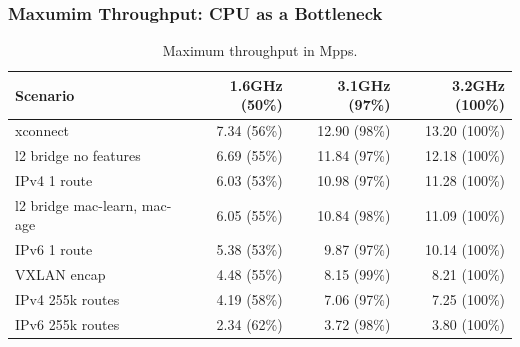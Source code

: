 \begin{frame}
    \frametitle{Maxumim Throughput: CPU as a Bottleneck}


    \begin{table}[!ht]
        \vspace{5ex}
        \begin{tabular}[]{ l r r r }
            Scenario & 1.6GHz (50\%) & 3.1GHz (97\%)  & 3.2GHz (100\%) \\ 
            \midrule
            xconnect & 7.34 (56\%) & 12.90 (98\%) & 13.20 (100\%) \\ %
            l2 bridge no features & 6.69 (55\%) & 11.84 (97\%) & 12.18 (100\%) \\ %
            IPv4 1 route & 6.03 (53\%) & 10.98 (97\%) & 11.28 (100\%) \\ %
            l2 bridge mac-learn, mac-age & 6.05 (55\%) & 10.84 (98\%) & 11.09 (100\%) \\ %
            IPv6 1 route & 5.38 (53\%) & 9.87 (97\%) & 10.14 (100\%) \\ %
            VXLAN encap & 4.48 (55\%) & 8.15 (99\%) & 8.21 (100\%) \\ %
            IPv4 255k routes & 4.19 (58\%) & 7.06 (97\%) & 7.25 (100\%) \\ %
            IPv6 255k routes & 2.34 (62\%) & 3.72 (98\%) & 3.80 (100\%) \\ %
            \midrule
        \end{tabular}
        \caption{Maximum throughput in Mpps.}
        \label{bottleneck}
    \end{table}
\end{frame}

